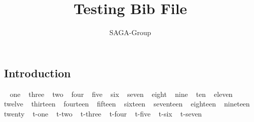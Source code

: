 \documentclass[a4paper,10pt]{article}
\newcommand{\jhanote}[1]{  {\textcolor{red}     { ***Shantenu: #1 }}}
\newcommand{\jhanote}[1]{}
\begin{document}
 \title{ \Large \vspace{-3.5em} Testing Bib File }
 
 \author{ SAGA-Group
 }
 \date{}
 \maketitle
 




\subsection*{Introduction}



~\cite {saga-req} one
~\cite {Kaiser:2006qp} three
~\cite {saga-uc} two
  ~\cite {saga_escience07} four 
   ~\cite {saga_gin} five
    ~\cite {escience07} six
     ~\cite {saga_condor} seven
      ~\cite {Luckow:2008la} eight
       ~\cite {saga_gfd90} nine
       ~\cite{saga_url} ten
	~\cite {saga_grid_cloud_interop} eleven
	~\cite {saga_data_intensive_abstractions} twelve
	~\cite {sagamontage09} thirteen
	~\cite {dpagrid2009} fourteen
	~\cite {saga_bigjob_condor_cloud} fifteen
	~\cite {saga_mapreduce} sixteen
	~\cite {saga_condor_url} seventeen
	~\cite {remd-manager_url} eighteen
	~\cite {gridrpc_url} nineteen
	~\cite {saga_tg08} twenty
	~\cite {repex_ptrsa} t-one
	~\cite {jsaga} t-two
	~\cite {glite} t-three
	~\cite {ogf_web} t-four
	~\cite {saga_core_long} t-five
	~\cite {saga-tools} t-six
	~\cite {sagastuff} t-seven

 
  
 
\end{document}
